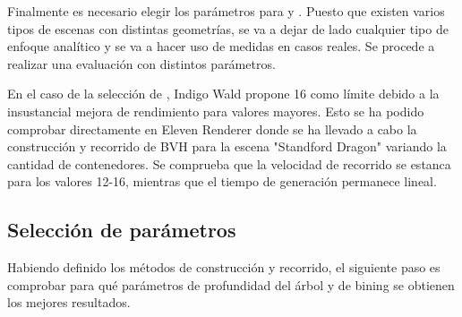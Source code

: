 Finalmente es necesario elegir los parámetros para  y . Puesto que existen varios tipos de escenas con distintas geometrías, se va a dejar de lado cualquier tipo de enfoque analítico y se va a hacer uso de medidas en casos reales. Se procede a realizar una evaluación con distintos parámetros.
	
En el caso de la selección de , Indigo Wald propone 16 como límite\cite{wald2007fast} debido a la insustancial mejora de rendimiento para valores mayores. Esto se ha podido comprobar directamente en Eleven Renderer donde se ha llevado a cabo la construcción y recorrido de BVH para la escena "Standford Dragon" variando la cantidad de contenedores. Se comprueba que la velocidad de recorrido se estanca para los valores 12-16, mientras que el tiempo de generación permanece lineal.


\subsection{Selección de parámetros}

Habiendo definido los métodos de construcción y recorrido, el siguiente paso es comprobar para qué parámetros de profundidad del árbol y de bining se obtienen los mejores resultados.


